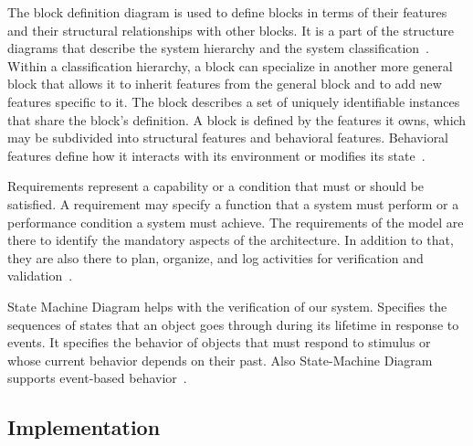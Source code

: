 \documentclass[conference]{IEEEtran}
\begin{document}
The block definition diagram is used to define blocks in terms of their features and their structural relationships with other blocks. It is a part of the structure diagrams that describe the system hierarchy and the system classification~\cite{b4}. Within a classification hierarchy, a block can specialize in another more general block that allows it to inherit features from the general block and to add new features specific to it. The block describes a set of uniquely identifiable instances that share the block’s definition. A block is defined by the features it owns, which may be subdivided into structural features and behavioral features. Behavioral features define how it interacts with its environment or modifies its state~\cite{b4}. 

Requirements represent a capability or a condition that must or should be satisfied. A requirement may specify a function that a system must perform or a performance condition a system must achieve. The requirements of the model are there to identify the mandatory aspects of the architecture. In addition to that, they are also there to plan, organize, and log activities for verification and validation~\cite{b5}.

State Machine Diagram helps with the verification of our system. Specifies the sequences of states that an object goes through during its lifetime in response to events. It specifies the behavior of objects that must respond to stimulus or whose current behavior depends on their past. Also State-Machine Diagram supports event-based behavior~\cite{b5}. 

\subsection{Implementation}
\end{document}
